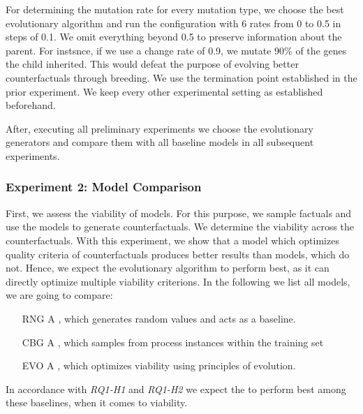 \documentclass[./../../paper.tex]{subfiles}
\begin{document}
For determining the mutation rate for every mutation type, we choose the best evolutionary algorithm and run the configuration with 6 rates from 0 to 0.5 in steps of 0.1. We omit everything beyond 0.5 to preserve information about the parent. For instsnce, if we use a change rate of 0.9, we mutate 90\% of the genes the child inherited. This would defeat the purpose of evolving better counterfactuals through breeding. We use the termination point established in the prior experiment. We keep every other experimental setting as established beforehand. 

After, executing all preliminary experiments we choose the evolutionary generators and compare them with all baseline models in all subsequent experiments.






\subsubsection{Experiment 2: Model Comparison}
First, we assess the viability of  models. For this purpose, we sample  factuals and use the models to generate  counterfactuals. We determine the  viability across the counterfactuals. With this experiment, we show that a model which optimizes quality criteria of counterfactuals produces better results than models, which do not. Hence, we expect the evolutionary algorithm to perform best, as it can directly optimize multiple viability criterions. In the following we list all models, we are going to compare:

\begin{enumerate}
    \item[RNG] A \ModelRNG, which generates random values and acts as a baseline. 
    \item[CBG] A \ModelCBG, which samples from process instances within the training set
    \item[EVO] A \ModelEVOFSR, which optimizes viability using principles of evolution.
\end{enumerate}

In accordance with \emph{RQ1-H1} and \emph{RQ1-H2} we expect the \ModelEVOFSR to perform best among these baselines, when it comes to viability.
\end{document}
